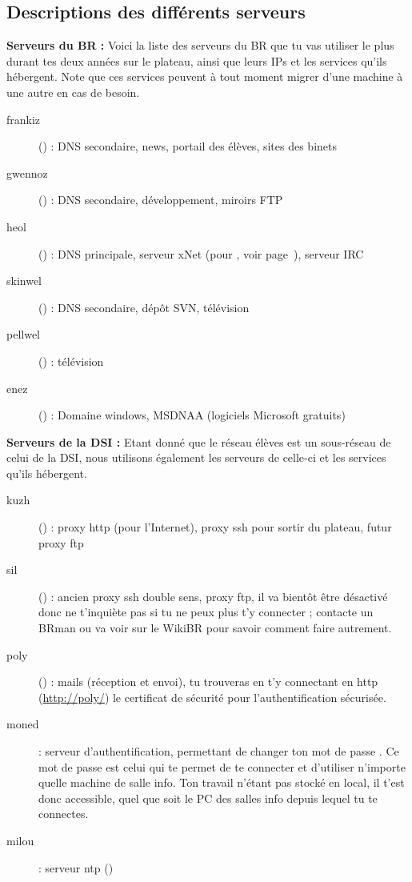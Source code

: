 \subsection{Descriptions des différents serveurs}
{\bf Serveurs du BR :} Voici la liste des serveurs du BR que tu vas
utiliser le plus durant tes deux années sur le plateau, ainsi que
leurs IPs et les services qu'ils hébergent. Note que ces services
peuvent à tout moment migrer d'une machine à une autre en cas de
besoin.


\begin{description}
        \item[frankiz] () : DNS secondaire,
        news, portail des élèves, sites des binets
        \item[gwennoz] () : DNS secondaire,
        développement, miroirs FTP
        \item[heol] () : DNS principale,
        serveur xNet (pour , voir page~\pageref{qrezix}), serveur IRC
        \item[skinwel] () : DNS secondaire,
        dépôt SVN, télévision
	\item[pellwel] () : télévision
    \item[enez] () : Domaine windows, MSDNAA (logiciels Microsoft gratuits)
\end {description}

{\bf Serveurs de la DSI : }Etant donné que le réseau élèves est un
sous-réseau de celui de la DSI, nous utilisons également les
serveurs de celle-ci et les services qu'ils hébergent.

\begin{description}
        \item[kuzh] () : proxy http (pour l'Internet), proxy ssh pour sortir du plateau, futur proxy ftp
        \item[sil] () : ancien proxy ssh double sens, proxy ftp, il va bient\^ot \^etre d\'esactiv\'e donc ne t'inqui\`ete pas si tu ne peux plus t'y connecter ; contacte un BRman ou va voir sur le WikiBR pour savoir comment faire autrement. 
        \item[poly] () : mails (réception et envoi), tu trouveras en t'y connectant en http (\url{http://poly/}) le certificat de sécurité pour l'authentification sécurisée.
        \item[moned] : serveur d'authentification, permettant de
        changer ton mot de passe . Ce mot de passe est celui qui
        te permet de te connecter et d'utiliser n'importe
        quelle machine de salle info. Ton travail n'étant pas stocké
        en local, il t'est donc accessible, quel que soit le PC des salles info depuis
        lequel tu te connectes.
    \item[milou] : serveur ntp ()
\end {description}

